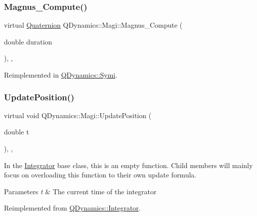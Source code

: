 \subsubsection{\texorpdfstring{Magnus\+\_\+\+Compute()}{Magnus\_Compute()}}
{\footnotesize\ttfamily virtual \hyperlink{classQDynamics_1_1Quaternion}{Quaternion} Q\+Dynamics\+::\+Magi\+::\+Magnus\+\_\+\+Compute (\begin{DoxyParamCaption}\item[{double}]{duration }\end{DoxyParamCaption})\hspace{0.3cm}{\ttfamily [inline]}, {\ttfamily [protected]}, {\ttfamily [virtual]}}



Reimplemented in \hyperlink{classQDynamics_1_1Symi_a4cea691ad899227f92004dd666180415}{Q\+Dynamics\+::\+Symi}.

\mbox{\label{classQDynamics_1_1Magi_a500467f899244edfae15f34c84c7684c}} 
\subsubsection{\texorpdfstring{Update\+Position()}{UpdatePosition()}}
{\footnotesize\ttfamily virtual void Q\+Dynamics\+::\+Magi\+::\+Update\+Position (\begin{DoxyParamCaption}\item[{double}]{t }\end{DoxyParamCaption})\hspace{0.3cm}{\ttfamily [inline]}, {\ttfamily [protected]}, {\ttfamily [virtual]}}



In the \hyperlink{classQDynamics_1_1Integrator}{Integrator} base class, this is an empty function. Child members will mainly focus on overloading this function to their own update formula. 


\begin{DoxyParams}{Parameters}
{\em t} & The current time of the integrator \\
\hline
\end{DoxyParams}


Reimplemented from \hyperlink{classQDynamics_1_1Integrator_a4effa27d56f3205e53653b1fdc5cd08e}{Q\+Dynamics\+::\+Integrator}.



